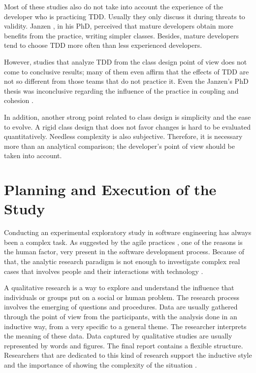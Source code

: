 \documentclass[times]{elsarticle}
\begin{document}
Most of these studies also do not take into account the experience
of the developer who is practicing TDD. Usually they only discuss it
during threats to validity. Janzen \cite{janzen-phd}, in his PhD, perceived
that mature developers obtain more benefits from the practice, writing simpler
classes. Besides, mature developers tend to choose TDD more often than
less experienced developers.

However, studies that analyze TDD from the class design point of view does not
come to conclusive results; many of them even affirm that the effects of TDD
are not so different from those teams that do not practice it. Even the Janzen's PhD
thesis was inconclusive regarding the influence of the practice in coupling
and cohesion \cite{janzen-phd}. 

In addition, another strong point related to class design is simplicity and
the ease to evolve. A rigid class design that does not favor changes is hard
to be evaluated quantitatively. Needless complexity is also subjective.
Therefore, it is necessary more than an analytical comparison; the
developer's point of view should be taken into account.

\section{Planning and Execution of the Study} 
\label{sec:planejamento}

Conducting an experimental exploratory study in software engineering has always
been a complex task. As suggested by the agile practices \cite{AgileManifesto}, 
one of the reasons is the human factor, very present in 
the software development process. Because of that, the analytic research
paradigm is not enough to investigate complex real cases that involves people
and their interactions with technology \cite{guidelines-case-study}.

A qualitative research is a way to explore and understand the influence that
individuals or groups put on a social or human problem. The research process
involves the emerging of questions and procedures. Data are usually gathered through
the point of view from the participants, with the analysis done in an inductive
way, from a very specific to a general theme. The researcher interprets
the meaning of these data. Data captured by qualitative studies are usually
represented by words and figures. The final report contains a flexible structure.
Researchers that are dedicated to this kind of research support the inductive style and
the importance of showing the complexity of the situation \cite{creswell}.
\end{document}
